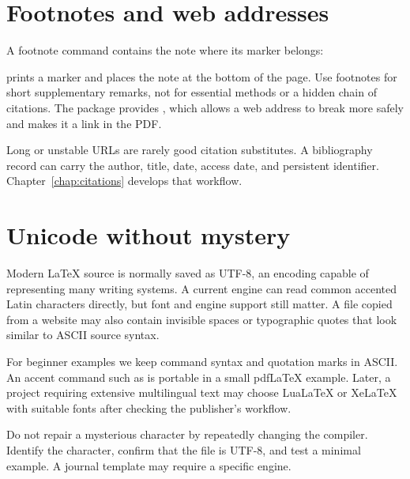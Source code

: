 \section{Footnotes and web addresses}

A footnote command contains the note where its marker belongs:


 prints a marker and places the note at the bottom of the page.
Use footnotes for short supplementary remarks, not for essential methods or a
hidden chain of citations. The  package provides ,
which allows a web address to break more safely and makes it a link in the PDF.

Long or unstable URLs are rarely good citation substitutes. A bibliography
record can carry the author, title, date, access date, and persistent
identifier. Chapter~\ref{chap:citations} develops that workflow.

\section{Unicode without mystery}

Modern \LaTeX{} source is normally saved as UTF-8, an encoding capable of
representing many writing systems. A current engine can read common accented
Latin characters directly, but font and engine support still matter. A file
copied from a website may also contain invisible spaces or typographic quotes
that look similar to ASCII source syntax.

For beginner examples we keep command syntax and quotation marks in ASCII. An
accent command such as  is portable in a small
pdf\LaTeX{} example. Later, a project requiring extensive multilingual text may
choose Lua\LaTeX{} or Xe\LaTeX{} with suitable fonts after checking the publisher's
workflow.

\begin{goodpractice}
Do not repair a mysterious character by repeatedly changing the compiler.
Identify the character, confirm that the file is UTF-8, and test a minimal
example. A journal template may require a specific engine.
\end{goodpractice}

